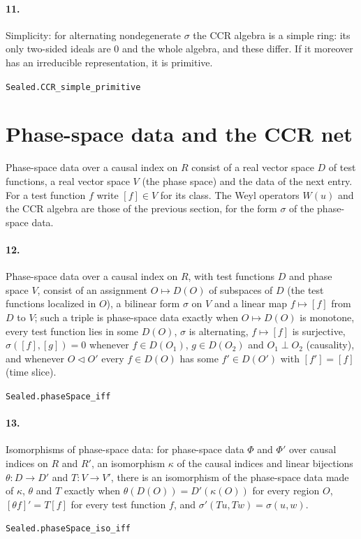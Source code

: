 \documentclass[11pt]{article}
\begin{document}
\paragraph{11.} Simplicity: for alternating nondegenerate $\sigma$ the CCR algebra is a simple ring: its only two-sided ideals are $0$ and the whole algebra, and these differ. If it moreover has an irreducible representation, it is primitive.\par{\footnotesize\texttt{Sealed.CCR\_simple\_primitive}}

\section*{Phase-space data and the CCR net}
Phase-space data over a causal index on $R$ consist of a real vector space $D$ of test functions, a real vector space $V$ (the phase space) and the data of the next entry. For a test function $f$ write $[f] \in V$ for its class. The Weyl operators $W(u)$ and the CCR algebra are those of the previous section, for the form $\sigma$ of the phase-space data.

\paragraph{12.} Phase-space data over a causal index on $R$, with test functions $D$ and phase space $V$, consist of an assignment $O \mapsto D(O)$ of subspaces of $D$ (the test functions localized in $O$), a bilinear form $\sigma$ on $V$ and a linear map $f \mapsto [f]$ from $D$ to $V$; such a triple is phase-space data exactly when $O \mapsto D(O)$ is monotone, every test function lies in some $D(O)$, $\sigma$ is alternating, $f \mapsto [f]$ is surjective, $\sigma([f], [g]) = 0$ whenever $f \in D(O_1)$, $g \in D(O_2)$ and $O_1 \perp O_2$ (causality), and whenever $O \triangleleft O'$ every $f \in D(O)$ has some $f' \in D(O')$ with $[f'] = [f]$ (time slice).\par{\footnotesize\texttt{Sealed.phaseSpace\_iff}}

\paragraph{13.} Isomorphisms of phase-space data: for phase-space data $\Phi$ and $\Phi'$ over causal indices on $R$ and $R'$, an isomorphism $\kappa$ of the causal indices and linear bijections $\theta : D \to D'$ and $T : V \to V'$, there is an isomorphism of the phase-space data made of $\kappa$, $\theta$ and $T$ exactly when $\theta(D(O)) = D'(\kappa(O))$ for every region $O$, $[\theta f]' = T [f]$ for every test function $f$, and $\sigma'(T u, T w) = \sigma(u, w)$.\par{\footnotesize\texttt{Sealed.phaseSpace\_iso\_iff}}
\end{document}
